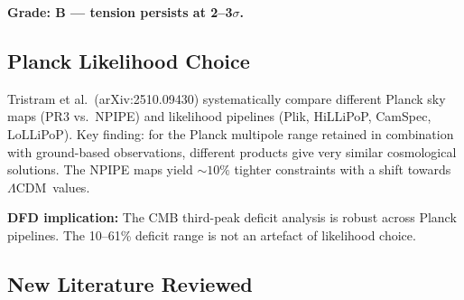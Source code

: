 \documentclass[11pt]{article}
\newcommand{\LCDM}{$\Lambda$CDM}
\begin{document}
\textbf{Grade: B --- tension persists at 2--3$\sigma$.}

\subsection{Planck Likelihood Choice}

Tristram et al.\ (arXiv:2510.09430) systematically compare
different Planck sky maps (PR3 vs.\ NPIPE) and likelihood pipelines
(Plik, HiLLiPoP, CamSpec, LoLLiPoP). Key finding: for the Planck
multipole range retained in combination with ground-based observations,
different products give very similar cosmological solutions. The NPIPE
maps yield $\sim 10\%$ tighter constraints with a shift towards
\LCDM\ values.

\textbf{DFD implication:} The CMB third-peak deficit analysis is
robust across Planck pipelines. The 10--61\% deficit range is not
an artefact of likelihood choice.

\subsection{New Literature Reviewed}
\end{document}
